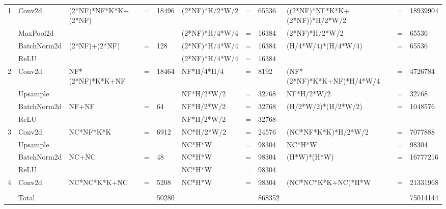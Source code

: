 \documentclass{article}
\begin{document}
\begin{tiny}
\begin{tabular}{@{}lllllllllll@{}}
1     & Conv2d                      & (2*NF)*NF*K*K+(2*NF) & =  & 18496 & (2*NF)*H/2*W/2 & = & 65536  & ((2*NF)*NF*K*K+(2*NF))*H/2*W/2 & = & 18939904 \\
      & MaxPool2d                   &                      &    &       & (2*NF)*H/4*W/4 & = & 16384  & (2*NF)*H/2*W/2                 & = & 65536    \\
      & BatchNorm2d                 & (2*NF)+(2*NF)        & =  & 128   & (2*NF)*H/4*W/4 & = & 16384  & (H/4*W/4)*(H/4*W/4)            & = & 65536    \\
      & ReLU                        &                      &    &       & (2*NF)*H/4*W/4 & = & 16384  &                                &   &          \\
2     & Conv2d                      & NF*(2*NF)*K*K+NF     & =  & 18464 & NF*H/4*H/4     & = & 8192   & (NF*(2*NF)*K*K+NF)*H/4*W/4     & = & 4726784  \\
      & Upsample                    &                      &    &       & NF*H/2*W/2     & = & 32768  & NF*H/2*W/2                     & = & 32768    \\
      & BatchNorm2d                 & NF+NF                & =  & 64    & NF*H/2*W/2     & = & 32768  & (H/2*W/2)*(H/2*W/2)            & = & 1048576  \\
      & ReLU                        &                      &    &       & NF*H/2*W/2     & = & 32768  &                                &   &          \\
3     & Conv2d                      & NC*NF*K*K            & =  & 6912  & NC*H/2*W/2     & = & 24576  & (NC*NF*K*K)*H/2*W/2            & = & 7077888  \\
      & Upsample                    &                      &    &       & NC*H*W         & = & 98304  & NC*H*W                         & = & 98304    \\
      & BatchNorm2d                 & NC+NC                & =  & 48    & NC*H*W         & = & 98304  & (H*W)*(H*W)                    & = & 16777216 \\
      & ReLU                        &                      &    &       & NC*H*W         & = & 98304  &                                &   &          \\
4     & Conv2d                      & NC*NC*K*K+NC         & =  & 5208  & NC*H*W         & = & 98304  & (NC*NC*K*K+NC)*H*W             & = & 21331968 \\
      &                             &                      &    &       &                &   &        &                                &   &          \\\midrule
      & Total                       &                      &    & 50280 &                &   & 868352 &                                &   & 75014144 \\ \bottomrule
\end{tabular}
\end{tiny}
\end{document}
